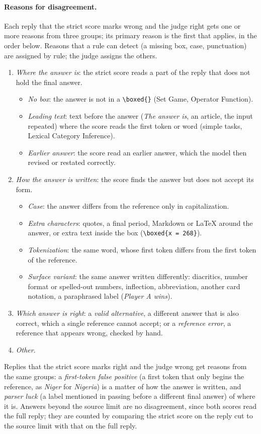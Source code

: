 \documentclass[11pt,a4paper]{article}
\begin{document}
\paragraph{Reasons for disagreement.} Each reply that the strict score marks wrong and the judge right gets one or more reasons from three groups; its primary reason is the first that applies, in the order below. Reasons that a rule can detect (a missing box, case, punctuation) are assigned by rule; the judge assigns the others.
\begin{enumerate}
\item \emph{Where the answer is}: the strict score reads a part of the reply that does not hold the final answer.
\begin{itemize}
\item \emph{No box}: the answer is not in a \texttt{\textbackslash boxed\{\}} (Set Game, Operator Function).
\item \emph{Leading text}: text before the answer (\emph{The answer is}, an article, the input repeated) where the score reads the first token or word (simple tasks, Lexical Category Inference).
\item \emph{Earlier answer}: the score read an earlier answer, which the model then revised or restated correctly.
\end{itemize}
\item \emph{How the answer is written}: the score finds the answer but does not accept its form.
\begin{itemize}
\item \emph{Case}: the answer differs from the reference only in capitalization.
\item \emph{Extra characters}: quotes, a final period, Markdown or \LaTeX{} around the answer, or extra text inside the box (\texttt{\textbackslash boxed\{x = 268\}}).
\item \emph{Tokenization}: the same word, whose first token differs from the first token of the reference.
\item \emph{Surface variant}: the same answer written differently: diacritics, number format or spelled-out numbers, inflection, abbreviation, another card notation, a paraphrased label (\emph{Player A wins}).
\end{itemize}
\item \emph{Which answer is right}: a \emph{valid alternative}, a different answer that is also correct, which a single reference cannot accept; or a \emph{reference error}, a reference that appears wrong, checked by hand.
\item \emph{Other}.
\end{enumerate}
Replies that the strict score marks right and the judge wrong get reasons from the same groups: a \emph{first-token false positive} (a first token that only begins the reference, as \emph{Niger} for \emph{Nigeria}) is a matter of how the answer is written, and \emph{parser luck} (a label mentioned in passing before a different final answer) of where it is. Answers beyond the source limit are no disagreement, since both scores read the full reply; they are counted by comparing the strict score on the reply cut to the source limit with that on the full reply.
\end{document}
